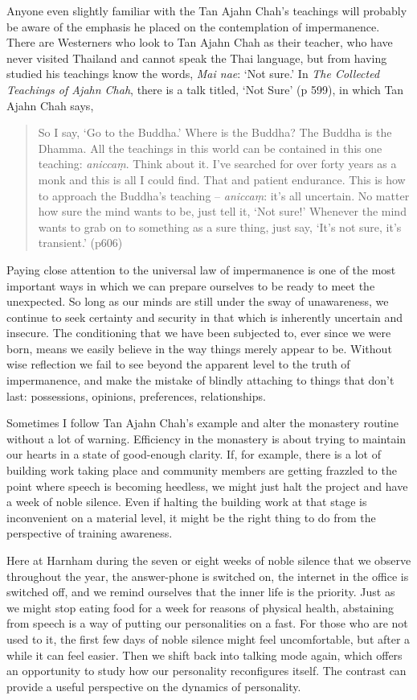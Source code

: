Anyone even slightly familiar with the Tan Ajahn Chah's teachings will
probably be aware of the emphasis he placed on the contemplation of
impermanence. There are Westerners who look to Tan Ajahn Chah as their
teacher, who have never visited Thailand and cannot speak the Thai
language, but from having studied his teachings know the words,
\emph{Mai nae}: `Not sure.' In \emph{The Collected Teachings of Ajahn Chah}\cite{collected},
there is a talk titled, `Not Sure' (p 599), in which Tan Ajahn Chah says,

\begin{quotation}
So I say, `Go to the Buddha.' Where is the Buddha? The Buddha is the
Dhamma. All the teachings in this world can be contained in this one
teaching: \emph{aniccaṃ}. Think about it. I've searched for over forty
years as a monk and this is all I could find. That and patient
endurance. This is how to approach the Buddha's teaching --
\emph{aniccaṃ}: it's all uncertain. No matter how sure the mind wants to
be, just tell it, `Not sure!' Whenever the mind wants to grab on to
something as a sure thing, just say, `It's not sure, it's transient.'
(p606)
\end{quotation}

Paying close attention to the universal law of impermanence is one of
the most important ways in which we can prepare ourselves to be ready to
meet the unexpected. So long as our minds are still under the sway of
unawareness, we continue to seek certainty and security in that which is
inherently uncertain and insecure. The conditioning that we have been
subjected to, ever since we were born, means we easily believe in the
way things merely appear to be. Without wise reflection we fail to see
beyond the apparent level to the truth of impermanence, and make the
mistake of blindly attaching to things that don't last: possessions,
opinions, preferences, relationships.

Sometimes I follow Tan Ajahn Chah's example and alter the monastery
routine without a lot of warning. Efficiency in the monastery is about
trying to maintain our hearts in a state of good-enough clarity. If, for
example, there is a lot of building work taking place and community
members are getting frazzled to the point where speech is becoming
heedless, we might just halt the project and have a week of noble
silence. Even if halting the building work at that stage is inconvenient
on a material level, it might be the right thing to do from the
perspective of training awareness.

Here at Harnham during the seven or eight weeks of noble silence that we
observe throughout the year, the answer-phone is switched on, the
internet in the office is switched off, and we remind ourselves that the
inner life is the priority. Just as we might stop eating food for a week
for reasons of physical health, abstaining from speech is a way of
putting our personalities on a fast. For those who are not used to it,
the first few days of noble silence might feel uncomfortable, but after
a while it can feel easier. Then we shift back into talking mode
again, which offers an opportunity to study how our personality
reconfigures itself. The contrast can provide a useful perspective on
the dynamics of personality.

